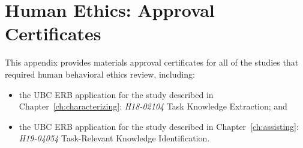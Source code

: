 \chapter{Human Ethics: Approval Certificates}


This appendix provides materials approval certificates for all of the studies 
that required human behavioral ethics review, including:


\begin{itemize}
    \item the \acs{UBC} \acs{ERB} application for the study described in Chapter~\ref{ch:characterizing}: \textit{H18-02104} Task Knowledge Extraction; and
    \item the \acs{UBC} \acs{ERB} application for the study described in Chapter~\ref{ch:assisting}: \textit{H19-04054} Task-Relevant Knowledge Identification.
\end{itemize}







